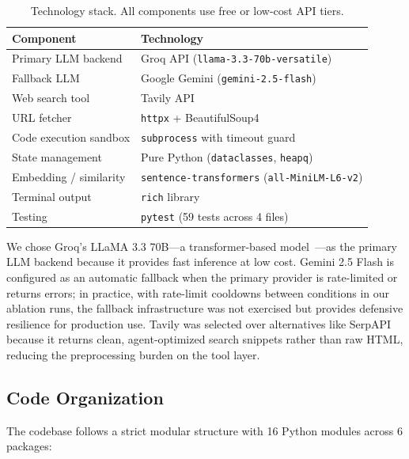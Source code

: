 \documentclass[11pt]{article}
\begin{document}
\begin{table}[H]
\centering
\caption{Technology stack. All components use free or low-cost API tiers.}
\label{tab:stack}
\small
\begin{tabular}{@{}ll@{}}
\toprule
\textbf{Component} & \textbf{Technology} \\
\midrule
Primary LLM backend & Groq API (\texttt{llama-3.3-70b-versatile}) \\
Fallback LLM & Google Gemini (\texttt{gemini-2.5-flash}) \\
Web search tool & Tavily API \\
URL fetcher & \texttt{httpx} + BeautifulSoup4 \\
Code execution sandbox & \texttt{subprocess} with timeout guard \\
State management & Pure Python (\texttt{dataclasses}, \texttt{heapq}) \\
Embedding / similarity & \texttt{sentence-transformers} (\texttt{all-MiniLM-L6-v2}) \\
Terminal output & \texttt{rich} library \\
Testing & \texttt{pytest} (59 tests across 4 files) \\
\bottomrule
\end{tabular}
\end{table}

We chose Groq's LLaMA 3.3 70B---a transformer-based model~\cite{vaswani2017attention}---as the primary LLM backend because it provides fast inference at low cost. Gemini 2.5 Flash is configured as an automatic fallback when the primary provider is rate-limited or returns errors; in practice, with rate-limit cooldowns between conditions in our ablation runs, the fallback infrastructure was not exercised but provides defensive resilience for production use. Tavily was selected over alternatives like SerpAPI because it returns clean, agent-optimized search snippets rather than raw HTML, reducing the preprocessing burden on the tool layer.

\subsection{Code Organization}

The codebase follows a strict modular structure with 16 Python modules across 6 packages:
\end{document}
